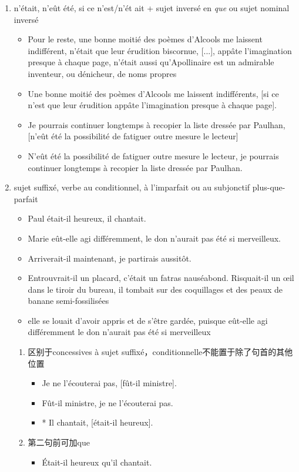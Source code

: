 \documentclass[UTF8]{report}
\begin{document}
\begin{enumerate}
    \item n’était, n’eût été, si ce n’est/n’ét ait + sujet inversé en \textit{que} ou sujet nominal inversé
    \begin{itemize}
        \item Pour le reste, une bonne moitié des poèmes d’Alcools me laissent indifférent, n’était que leur érudition biscornue, [...], appâte l’imagination presque à chaque page, n’était aussi qu’Apollinaire est un admirable inventeur, ou dénicheur, de noms propres
        \item Une bonne moitié des poèmes d’Alcools me laissent indifférents, [si ce n’est que leur érudition appâte l’imagination presque à chaque page].
        \item Je pourrais continuer longtemps à recopier la liste dressée par Paulhan, [n’eût été la possibilité de fatiguer outre mesure le lecteur]
        \item N’eût été la possibilité de fatiguer outre mesure le lecteur, je pourrais continuer longtemps à recopier la liste dressée par Paulhan.
    \end{itemize}
    \item sujet suffixé, verbe au conditionnel, à l’imparfait ou au subjonctif plus-que-parfait
    \begin{itemize}
        \item Paul était-il heureux, il chantait.
        \item Marie eût-elle agi différemment, le don n’aurait pas été si merveilleux.
        \item Arriverait-il maintenant, je partirais aussitôt.
        \item Entrouvrait-il un placard, c’était un fatras nauséabond. Risquait-il un œil dans le tiroir du bureau, il tombait sur des coquillages et des peaux de banane semi-fossilisées
        \item elle se louait d’avoir appris et de s’être gardée, puisque eût-elle agi différemment le don n’aurait pas été si merveilleux
    \end{itemize}
    \begin{enumerate}
        \item 区别于concessives à sujet suffixé，conditionnelle不能置于除了句首的其他位置
        \begin{itemize}
            \item Je ne l’écouterai pas, [fût-il ministre].
            \item Fût-il ministre, je ne l’écouterai pas.
            \item * Il chantait, [était-il heureux].
        \end{itemize}
        \item 第二句前可加que
        \begin{itemize}
            \item Était-il heureux qu’il chantait.
        \end{itemize}
    \end{enumerate}
\end{enumerate}
\end{document}
